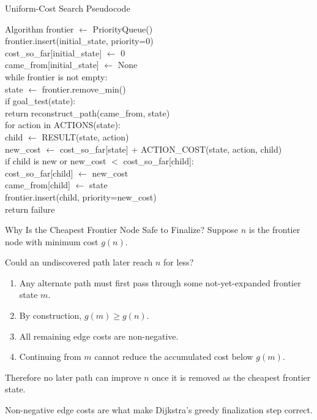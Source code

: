 \documentclass[aspectratio=169,10pt]{beamer}
\begin{document}
\begin{frame}[shrink=20]{Uniform-Cost Search Pseudocode}
  \begin{block}{Algorithm}
  \ttfamily\small
  frontier $\leftarrow$ PriorityQueue()\\
  frontier.insert(initial\_state, priority=0)\\
  cost\_so\_far[initial\_state] $\leftarrow$ 0\\
  came\_from[initial\_state] $\leftarrow$ None\\[0.06in]

  while frontier is not empty:\\
  \quad state $\leftarrow$ frontier.remove\_min()\\[0.03in]
  \quad if goal\_test(state):\\
  \qquad return reconstruct\_path(came\_from, state)\\[0.03in]
  \quad for action in ACTIONS(state):\\
  \qquad child $\leftarrow$ RESULT(state, action)\\
  \qquad new\_cost $\leftarrow$ cost\_so\_far[state] + ACTION\_COST(state, action, child)\\
  \qquad if child is new or new\_cost $<$ cost\_so\_far[child]:\\
  \qquad\quad cost\_so\_far[child] $\leftarrow$ new\_cost\\
  \qquad\quad came\_from[child] $\leftarrow$ state\\
  \qquad\quad frontier.insert(child, priority=new\_cost)\\[0.03in]
  return failure
  \end{block}
\end{frame}

\begin{frame}[shrink=20]{Why Is the Cheapest Frontier Node Safe to Finalize?}
  Suppose $n$ is the frontier node with minimum cost $g(n)$.

  Could an undiscovered path later reach $n$ for less?

  \begin{enumerate}
    \item Any alternate path must first pass through some not-yet-expanded frontier state $m$.
    \item By construction, $g(m)\ge g(n)$.
    \item All remaining edge costs are non-negative.
    \item Continuing from $m$ cannot reduce the accumulated cost below $g(m)$.
  \end{enumerate}

  Therefore no later path can improve $n$ once it is removed as the cheapest frontier state.

  \begin{keyidea}
    Non-negative edge costs are what make Dijkstra's greedy finalization step correct.
  \end{keyidea}
\end{frame}
\end{document}
